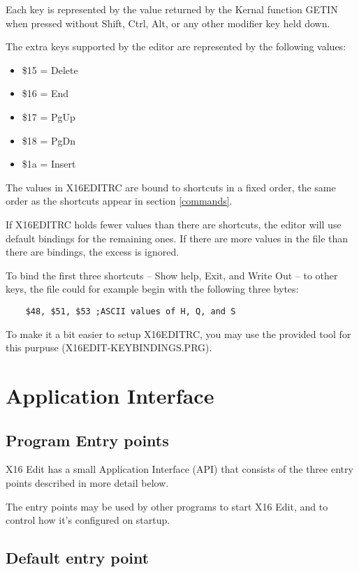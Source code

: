 \documentclass{article}
\begin{document}
Each key is represented by the value returned by the Kernal function GETIN when pressed
without Shift, Ctrl, Alt, or any other modifier key held down.

The extra keys supported by the editor are represented by the following values:

\begin{itemize}
    \item \$15 = Delete
    \item \$16 = End
    \item \$17 = PgUp
    \item \$18 = PgDn
    \item \$1a = Insert 
\end{itemize}

The values in X16EDITRC are bound to shortcuts in a fixed order, the same order as
the shortcuts appear in section \ref{commands}.

If X16EDITRC holds fewer values than there are shortcuts, the editor will use
default bindings for the remaining ones. If there are more values in the file than there
are bindings, the excess is ignored.

To bind the first three shortcuts -- Show help, Exit, and Write Out -- to other keys,
the file could for example begin with the following three bytes:

\begin{verbatim}
    $48, $51, $53 ;ASCII values of H, Q, and S
\end{verbatim}

To make it a bit easier to setup X16EDITRC, you may use the provided tool for
this purpuse (X16EDIT-KEYBINDINGS.PRG).

\section{Application Interface}

    \subsection{Program Entry points}

        X16 Edit has a small Application Interface (API) that consists of the three
        entry points described in more detail below.

        The entry points may be used by other programs to start X16 Edit, and to
        control how it's configured on startup.

    \subsection{Default entry point}
\end{document}
